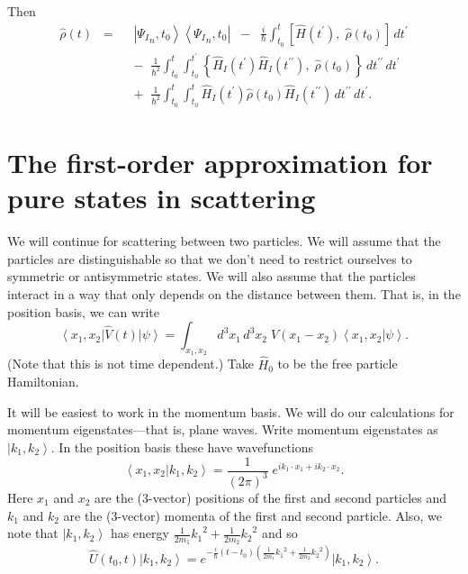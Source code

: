 \documentclass[11pt]{article}
\newcommand{\bra}[1]{\left\langle#1\right|}
\newcommand{\ket}[1]{\left|#1\right\rangle}
\newcommand{\braket}[2]{\left\langle#1|#2\right\rangle}
\newcommand{\op}[1]{\hat{#1}}
\theoremstyle{theorem}
\theoremstyle{remark}
\theoremstyle{step}
\theoremstyle{gap}
\begin{document}
Then
\begin{align}
\label{eq.rhoevol}
\op{\rho}(t) \;\;=\;\;& \ket{{\Psi_I}_n, t_0} \bra{{\Psi_I}_n, t_0}
\;\;-\;\; \frac{i}{\hbar} \int_{t_0}^t \left[\op{H}(t^\prime),\; \op{\rho}(t_0) \right] \,dt^\prime \\
& -\;\; \frac{1}{\hbar^2} \int_{t_0}^t \int_{t_0}^{t^\prime} \left\{ \op{H}_I (t^\prime) \op{H}_I(t^{\prime\prime}),\; \op{\rho}(t_0) \right\}\,dt^{\prime\prime}\,dt^\prime \nonumber\\
&+\;\; \frac{1}{\hbar^2} \int_{t_0}^t \int_{t_0}^{t} \op{H}_I (t^\prime) \op{\rho}(t_0) \op{H}_I (t^{\prime\prime})\,dt^{\prime\prime}\,dt^\prime \nonumber.
\end{align}


\appendix

\section{The first-order approximation for pure states in scattering}

We will continue for scattering between two particles. We will assume that the particles are distinguishable so that we don't need to restrict ourselves to symmetric or antisymmetric states. We will also assume that the particles interact in a way that only depends on the distance between them. That is, in the position basis, we can write
\begin{equation}\label{eq.Vposbasis}
\bra{x_1, x_2}\op{V}(t)\ket{\psi} = \int_{x_1,x_2} {d^3 x_1 \,d^3x_2}\; V(x_1 - x_2) \braket{x_1, x_2}{\psi}.
\end{equation}
(Note that this is not time dependent.) Take \(\op{H}_0\) to be the free particle Hamiltonian.

It will be easiest to work in the momentum basis. We will do our calculations for momentum eigenstates---that is, plane waves. Write momentum eigenstates as \(\ket{k_1, k_2}\). In the position basis these have wavefunctions
\begin{equation}\label{eq.momentuminpos}
\braket{x_1, x_2}{k_1, k_2} = \frac{1}{(2\pi)^3}\;e^{ik_1\cdot x_1 + ik_2\cdot x_2}.
\end{equation}
Here \(x_1\) and \(x_2\) are the (3-vector) positions of the first and second particles and \(k_1\) and \(k_2\) are the (3-vector) momenta of the first and second particle. Also, we note that \(\ket{k_1, k_2}\) has energy \(\frac{1}{2m_1}{k_1}^2 + \frac{1}{2m_2}{k_2}^2\) and so
\begin{equation}
\label{eq.timeevonk}
\op{U}(t_0, t) \ket{k_1, k_2} = e^{-\frac{i}{\hbar}\left(t-t_0\right)\left(\frac{1}{2m_1}{k_1}^2 + \frac{1}{2m_2}{k_2}^2\right)} \ket{k_1, k_2}.
\end{equation}
\end{document}
